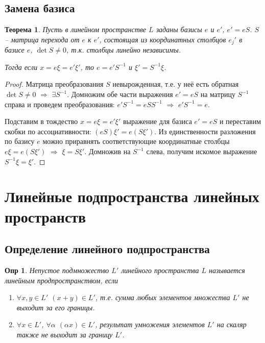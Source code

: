 \documentclass[a4paper,12pt]{article}
\newtheorem*{definition}{Опр}
\newtheorem{theorem}{Теорема}[section]
\begin{document}
\subsection{Замена базиса}
\begin{theorem}
	Пусть в линейном пространстве $L$ заданы базисы $e$ и $e'$, $e' = eS$. $S$ -- матрица перехода от $e$ к $e'$, состоящая из координатных столбцов $e_j'$ в базисе $e$, $\det S \ne 0$, т.к. столбцы линейно независимы.
	
	Тогда если $x = e \xi = e' \xi'$, то $e = e' S^{-1}$ и $\xi' = S^{-1} \xi$.
\end{theorem}
\begin{proof}
	Матрица преобразования $S$ невырожденная, т.е. у неё есть обратная $\det S \ne 0$ $\Rightarrow$ $ \exists S^{-1}$. Домножим обе части выражения $e' = eS$ на матрицу $S^{-1}$ справа и проведем преобразования: $e' S^{-1} = e S S^{-1}$ $\Rightarrow$ $e' S^{-1} = e$.
	
	Подставим в тождество $x = e \xi = e' \xi'$ выражение для базиса $e' = eS$ и переставим скобки по ассоциативности: $(eS) \xi' = e(S\xi')$. Из единственности разложения по базису $e$  можно приравнять соответствующие координатные столбцы $e \xi = e (S \xi')$ $\Rightarrow$ $\xi = S \xi'$. Домножив на $S^{-1}$ слева, получим искомое выражение $S^{-1} \xi = \xi'$.
\end{proof}


\section{Линейные подпространства линейных пространств}

\subsection{Определение линейного подпространства}

\begin{definition}
	Непустое подмножество $L'$ линейного пространства $L$ называется линейным продпространством, если 
	\begin{enumerate}
		\item $\forall x, y \in L'$  $(x + y) \in L'$, т.е. сумма любых элементов множества $L'$ не выходит за его границы.
		\item $\forall x \in L'$, $\forall \alpha$ $(\alpha x ) \in L'$, результат умножения элементов $L'$ на скаляр также не выходит за границу $L'$.
	\end{enumerate}
\end{definition}
\end{document}
